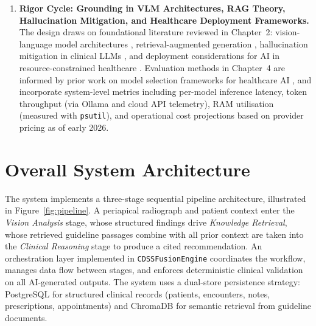 \documentclass[12pt,a4paper]{report}
\begin{document}
\begin{enumerate}
		\item \textbf{Rigor Cycle: Grounding in VLM Architectures, RAG Theory,
			Hallucination Mitigation, and Healthcare Deployment Frameworks.}
		The design draws on foundational literature reviewed in Chapter~2:
		vision-language model architectures \cite{Li2023MultimodalFoundationModels,
			zhang2023biomedclip}, retrieval-augmented generation
		\cite{lewis2020retrieval, firoozi2025rag_dentistry}, hallucination
		mitigation in clinical LLMs \cite{ji2023survey, Wada2025RAGRadiology},
		and deployment considerations for AI in resource-constrained healthcare
		\cite{Edward2024OralHealthTZ, tanzania_oral_health_policy}. Evaluation
		methods in Chapter~4 are informed by prior work on model selection
		frameworks for healthcare AI \cite{schwendicke2022ai_global,
			schwendicke2021demystifying_ai}, and incorporate system-level metrics
		including per-model inference latency, token throughput (via Ollama and
		cloud API telemetry), RAM utilisation (measured with \texttt{psutil}),
		and operational cost projections based on provider pricing as of early
		2026.
		
	\end{enumerate}
	
	
	
	\section{Overall System Architecture}
	\label{sec:architecture}
	
	The system implements a three-stage sequential pipeline architecture, illustrated in
	Figure~\ref{fig:pipeline}. A periapical radiograph and patient context enter the
	\textit{Vision Analysis} stage, whose structured findings drive \textit{Knowledge Retrieval},
	whose retrieved guideline passages combine with all prior context are taken into the
	\textit{Clinical Reasoning} stage to produce a cited recommendation. An orchestration
	layer implemented in \texttt{CDSSFusionEngine} coordinates the workflow, manages data
	flow between stages, and enforces deterministic clinical validation on all AI-generated
	outputs. The system uses a dual-store persistence strategy: PostgreSQL for structured
	clinical records (patients, encounters, notes, prescriptions, appointments) and ChromaDB
	for semantic retrieval from guideline documents.
	
\end{document}
